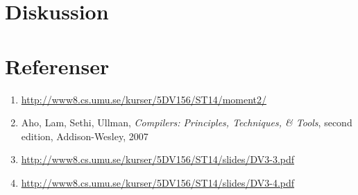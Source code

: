 \section{Diskussion}





\section{Referenser}

\begin{enumerate}
  \item  \url{http://www8.cs.umu.se/kurser/5DV156/ST14/moment2/}
  \item Aho, Lam, Sethi, Ullman, \textit{Compilers: Principles, Techniques, \& Tools}, second edition, Addison-Wesley, 2007
  \item \url{http://www8.cs.umu.se/kurser/5DV156/ST14/slides/DV3-3.pdf}
  \item \url{http://www8.cs.umu.se/kurser/5DV156/ST14/slides/DV3-4.pdf}
\end{enumerate}





